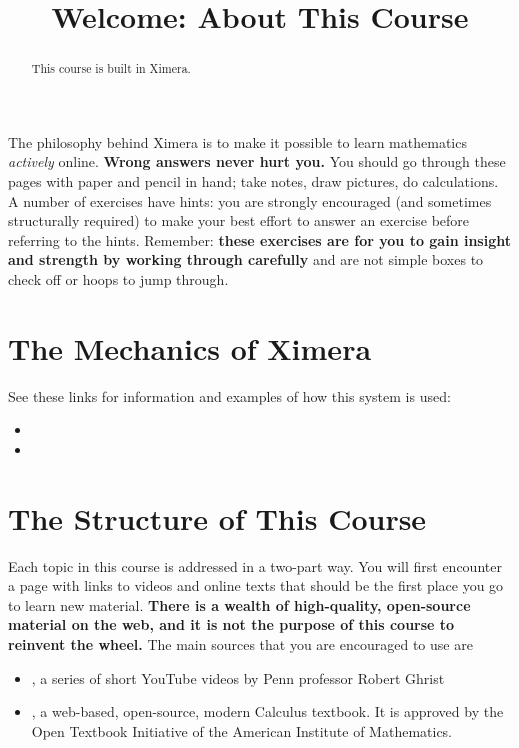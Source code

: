 \documentclass{ximera}
\title{Welcome: About This Course}
\begin{document}
\begin{abstract}
  This course is built in Ximera.
\end{abstract}\maketitle

The philosophy behind Ximera is to make it possible to learn mathematics \textit{actively} online. \textbf{Wrong answers never hurt you.} You should go through these pages with paper and pencil in hand; take notes, draw pictures, do calculations. A number of exercises have hints: you are strongly encouraged (and sometimes structurally required) to make your best effort to answer an exercise before referring to the hints.  Remember: \textbf{these exercises are for you to gain insight and strength by working through carefully} and are not simple boxes to check off or hoops to jump through.

\section*{The Mechanics of Ximera}

See these links for information and examples of how this system is used:
 \begin{itemize}
 \item {}
 \item {}
 \end{itemize}
  
  
 \section*{The Structure of This Course}
 
 Each topic in this course is addressed in a two-part way. You will first encounter a page with links to videos and online texts that should be the first place you go to learn new material. \textbf{There is a wealth of high-quality, open-source material on the web, and it is not the purpose of this course to reinvent the wheel.} The main sources that you are encouraged to use are
 
 \begin{itemize}
 \item {}, a series of short YouTube videos by Penn professor Robert Ghrist
 \item {}, a web-based, open-source, modern Calculus textbook. It is approved by the Open Textbook Initiative of the American Institute of Mathematics.
 \end{itemize}
 
\end{document}
